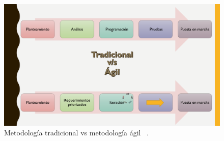 \begin{figure}[h]
  \includegraphics[width=\textwidth]{Imagenes/tradicional_vs_agil.png}
  \caption{\label{fig: dif_Metodologia} Metodología tradicional vs metodología ágil  ~\cite{17}.}
\end{figure}


